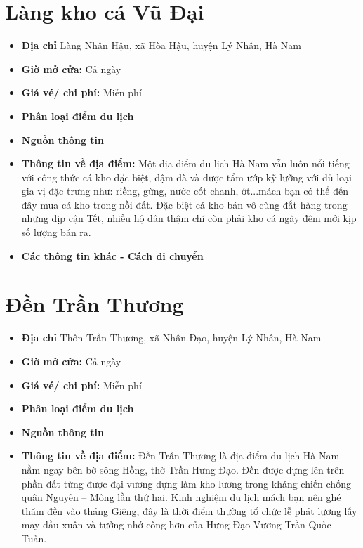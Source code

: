 \documentclass{article}
\begin{document}
\section{Làng kho cá Vũ Đại}
\begin{itemize}
    \item{\textbf{Địa chỉ}} Làng Nhân Hậu, xã Hòa Hậu, huyện Lý Nhân, Hà Nam

    \item{\textbf{Giờ mở cửa:}} Cả ngày

    \item{\textbf{Giá vé/ chi phí:}} Miễn phí

    \item{\textbf{Phân loại điểm du lịch}} 

    \item{\textbf{Nguồn thông tin}} 

    \item{\textbf{Thông tin về địa điểm:}} Một địa điểm du lịch Hà Nam vẫn luôn nổi tiếng với công thức cá kho đặc biệt, đậm đà và được tẩm ướp kỹ lưỡng với đủ loại gia vị đặc trưng như: riềng, gừng, nước cốt chanh, ớt...mách bạn có thể đến đây mua cá kho trong nồi đất. Đặc biệt cá kho bán vô cùng đắt hàng trong những dịp cận Tết, nhiều hộ dân thậm chí còn phải kho cá ngày đêm mới kịp số lượng bán ra.
\end{itemize}

\begin{itemize}
    \item{\textbf{Các thông tin khác - Cách di chuyển}} 
\end{itemize}

\section{Đền Trần Thương}
\begin{itemize}
    \item{\textbf{Địa chỉ}} Thôn Trần Thương, xã Nhân Đạo, huyện Lý Nhân, Hà Nam

    \item{\textbf{Giờ mở cửa:}} Cả ngày

    \item{\textbf{Giá vé/ chi phí:}} Miễn phí

    \item{\textbf{Phân loại điểm du lịch}} 

    \item{\textbf{Nguồn thông tin}} 

    \item{\textbf{Thông tin về địa điểm:}} Đền Trần Thương là địa điểm du lịch Hà Nam nằm ngay bên bờ sông Hồng, thờ Trần Hưng Đạo. Đền được dựng lên trên phần đất từng được đại vương dựng làm kho lương trong kháng chiến chống quân Nguyên – Mông lần thứ hai. Kinh nghiệm du lịch mách bạn nên ghé thăm đền vào tháng Giêng, đây là thời điểm thường tổ chức lễ phát lương lấy may đầu xuân và tưởng nhớ công hơn của Hưng Đạo Vương Trần Quốc Tuấn.
\end{itemize}
\end{document}
